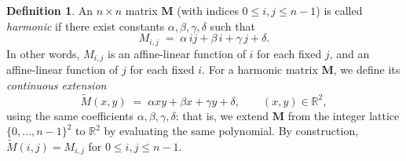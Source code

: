 \documentclass[a4paper,11pt]{article}
\theoremstyle{plain}
\theoremstyle{definition}
\newtheorem{definition}[theorem]{Definition}
\theoremstyle{remark}
\newcommand{\M}{\mathbf{M}}
\begin{document}
\begin{definition}
\label{def:harmonic}
An $n\times n$ matrix $\M$ (with indices $0\le i,j\le n-1$) is called
\emph{harmonic} if there exist constants $\alpha,\beta,\gamma,\delta$ such that
\[
  M_{i,j} \;=\; \alpha\,ij+\beta\,i+\gamma\,j+\delta.
\]
In other words, $M_{i,j}$ is an affine-linear function of $i$ for each
fixed $j$, and an affine-linear function of $j$ for each fixed $i$.
For a harmonic matrix $\M$, we define its \emph{continuous extension}
\[
  \widetilde M(x,y)\;=\;\alpha xy+\beta x+\gamma y+\delta,
  \qquad (x,y)\in\mathbb{R}^2,
\]
using the same coefficients $\alpha,\beta,\gamma,\delta$: that is, we
extend $\M$ from the integer lattice $\{0,\dots,n-1\}^2$ to $\mathbb{R}^2$
by evaluating the same polynomial. By construction,
$\widetilde M(i,j)=M_{i,j}$ for $0\le i,j\le n-1$.
\end{definition}
\end{document}

